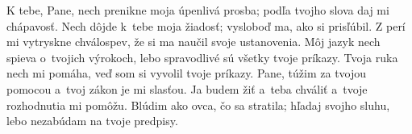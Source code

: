 K tebe, Pane, nech prenikne moja úpenlivá prosba;
podľa tvojho slova daj mi chápavosť.
\versseparator
Nech dôjde k~tebe moja žiadosť;
vysloboď ma, ako si prisľúbil.
\versseparator
Z perí mi vytryskne chválospev,
že si ma naučil svoje ustanovenia.
\versseparator
Môj jazyk nech spieva o~tvojich výrokoch,
lebo spravodlivé sú všetky tvoje príkazy.
\versseparator
Tvoja ruka nech mi pomáha,
veď som si vyvolil tvoje príkazy.
\versseparator
Pane, túžim za tvojou pomocou
a~tvoj zákon je mi slasťou.
\versseparator
Ja budem žiť a~teba chváliť
a~tvoje rozhodnutia mi pomôžu.
\versseparator
Blúdim ako ovca, čo sa stratila;
hľadaj svojho sluhu, lebo nezabúdam na tvoje predpisy.